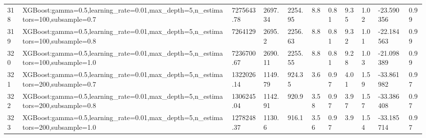 \begin{longtable}{C{0.8cm} L{2cm} C{1.15cm} C{1.15cm} C{1.15cm} C{1.15cm} C{0.85cm} C{1.25cm} C{1.2cm} C{1.5cm} C{1.0cm}}
318 & XGBoost:\newline gamma=0.5,\newline learning\_rate=0.01,\newline max\_depth=5,\newline n\_estimators=100,\newline subsample=0.7 & 7275643.78 & 2697.34 & 2254.95 & 8.8 & 0.81 & 9.35 & 1.02 & -23.590356 & 0.99 \\
319 & XGBoost:\newline gamma=0.5,\newline learning\_rate=0.01,\newline max\_depth=5,\newline n\_estimators=100,\newline subsample=0.8 & 7264129 & 2695.2 & 2256.63 & 8.8 & 0.81 & 9.32 & 1.01 & -22.184563 & 0.99 \\
320 & XGBoost:\newline gamma=0.5,\newline learning\_rate=0.01,\newline max\_depth=5,\newline n\_estimators=100,\newline subsample=1.0 & 7236700.67 & 2690.11 & 2255.55 & 8.8 & 0.81 & 9.28 & 1.03 & -21.098389 & 0.99 \\
321 & XGBoost:\newline gamma=0.5,\newline learning\_rate=0.01,\newline max\_depth=5,\newline n\_estimators=200,\newline subsample=0.7 & 1322026.14 & 1149.79 & 924.35 & 3.6 & 0.97 & 4.01 & 1.59 & -33.861982 & 0.97 \\
322 & XGBoost:\newline gamma=0.5,\newline learning\_rate=0.01,\newline max\_depth=5,\newline n\_estimators=200,\newline subsample=0.8 & 1306245.04 & 1142.91 & 920.9 & 3.58 & 0.97 & 3.97 & 1.57 & -33.386408 & 0.97 \\
323 & XGBoost:\newline gamma=0.5,\newline learning\_rate=0.01,\newline max\_depth=5,\newline n\_estimators=200,\newline subsample=1.0 & 1278248.37 & 1130.6 & 916.1 & 3.56 & 0.97 & 3.9 & 1.54 & -33.185714 & 0.97 \\

\end{longtable}
